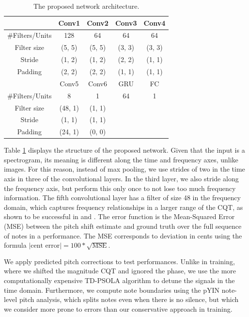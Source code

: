 \begin{table}[t]
  \begin{center}
    \caption{The proposed network architecture.}
    \begin{tabular}{|c||c|c|c|c|}
    \hline
      & Conv1 & Conv2 & Conv3 & Conv4 \\
      \hline
      \#Filters/Units & 128 & 64 & 64 & 64 \\
      Filter size & (5, 5) & (5, 5) & (3, 3) & (3, 3) \\
      Stride & (1, 2) & (1, 2) & (2, 2) & (1, 1) \\
      Padding & (2, 2) & (2, 2) & (1, 1) & (1, 1) \\
      \hline
      & Conv5 & Conv6 & GRU & FC \\
      \hline
      \#Filters/Units & 8 & 1 & 64 & 1 \\
      Filter size & (48, 1) & (1, 1) & & \\
      Stride & (1, 1) & (1, 1) & & \\
      Padding & (24, 1) & (0, 0) & & \\
      \hline
    \end{tabular}
    \vspace{-.1in}
    \label{tab:network}
  \end{center}
\end{table}

Table \ref{tab:network} displays the structure of the proposed network. Given that the input is a spectrogram, its meaning is different along the time and frequency axes, unlike images. For this reason, instead of max pooling, we use strides of two in the time axis in three of the convolutional layers. In the third layer, we also stride along the frequency axis, but perform this only once to not lose too much frequency information. The fifth convolutional layer has a filter of size 48 in the frequency domain, which captures frequency relationships in a larger range of the CQT, as shown to be successful in \cite{bittner2017deep} and \cite{hsu2017learning}. The error function is the Mean-Squared Error (MSE) between the pitch shift estimate and ground truth over the full sequence of notes in a performance. The MSE corresponds to deviation in cents using the formula $\left|\text{cent error}\right| = 100 * \sqrt{\text{MSE}}$.

We apply predicted pitch corrections to test performances. Unlike in training, where we shifted the magnitude CQT and ignored the phase, we use the more computationally expensive TD-PSOLA algorithm \cite{charpentier1986diphone} to detune the signals in the time domain. Furthermore, we compute note boundaries using the pYIN note-level pitch analysis, which splits notes even when there is no silence, but which we consider more prone to errors than our conservative approach in training. 

